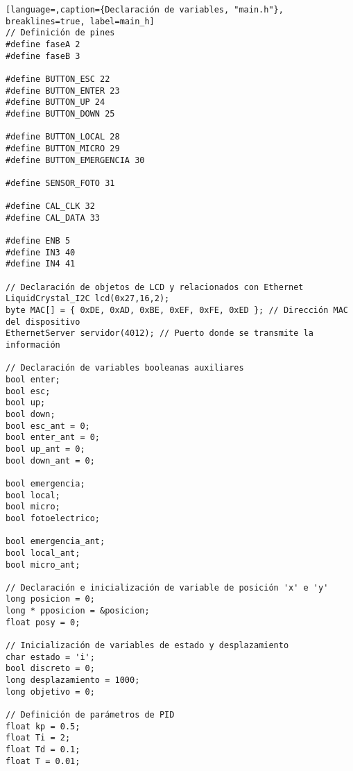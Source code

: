 
\begin{lstlisting}[language=,caption={Declaración de variables, "main.h"}, breaklines=true, label=main_h]
// Definición de pines
#define faseA 2
#define faseB 3

#define BUTTON_ESC 22
#define BUTTON_ENTER 23
#define BUTTON_UP 24
#define BUTTON_DOWN 25

#define BUTTON_LOCAL 28
#define BUTTON_MICRO 29
#define BUTTON_EMERGENCIA 30

#define SENSOR_FOTO 31

#define CAL_CLK 32
#define CAL_DATA 33

#define ENB 5
#define IN3 40
#define IN4 41

// Declaración de objetos de LCD y relacionados con Ethernet
LiquidCrystal_I2C lcd(0x27,16,2);
byte MAC[] = { 0xDE, 0xAD, 0xBE, 0xEF, 0xFE, 0xED }; // Dirección MAC del dispositivo
EthernetServer servidor(4012); // Puerto donde se transmite la información

// Declaración de variables booleanas auxiliares
bool enter;
bool esc;
bool up;
bool down;
bool esc_ant = 0;
bool enter_ant = 0;
bool up_ant = 0;
bool down_ant = 0;

bool emergencia;
bool local;
bool micro;
bool fotoelectrico;

bool emergencia_ant;
bool local_ant;
bool micro_ant;

// Declaración e inicialización de variable de posición 'x' e 'y'
long posicion = 0;
long * pposicion = &posicion;
float posy = 0;

// Inicialización de variables de estado y desplazamiento
char estado = 'i';
bool discreto = 0;
long desplazamiento = 1000;
long objetivo = 0;

// Definición de parámetros de PID
float kp = 0.5;
float Ti = 2;
float Td = 0.1;
float T = 0.01;
    
\end{lstlisting}
